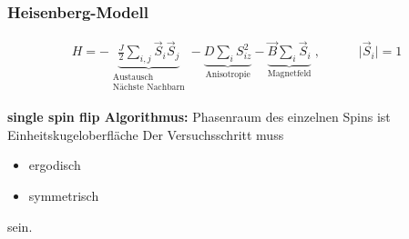 \documentclass[12pt]{article}
\begin{document}
\subsubsection{Heisenberg-Modell}
\begin{align}
H= - \underbrace{\frac{J}{2} \sum_{i,j} \vec{S}_i \vec{S}_j}_{\substack{\text{Austausch} \\ \text{Nächste Nachbarn}}}
 - \underbrace{ D \sum_i S_{iz}^2}_\text{Anisotropie} - \underbrace{\vec{B} \sum_i \vec{S}_i}_\text{Magnetfeld} \; , \quad \quad \quad \vert \vec{S}_i \vert =1
\end{align}

\textbf{single spin flip Algorithmus:} Phasenraum des einzelnen Spins ist Einheitskugeloberfläche 
Der Versuchsschritt muss
\begin{itemize}
\item ergodisch
\item symmetrisch
\end{itemize} %
sein. 
\end{document}
